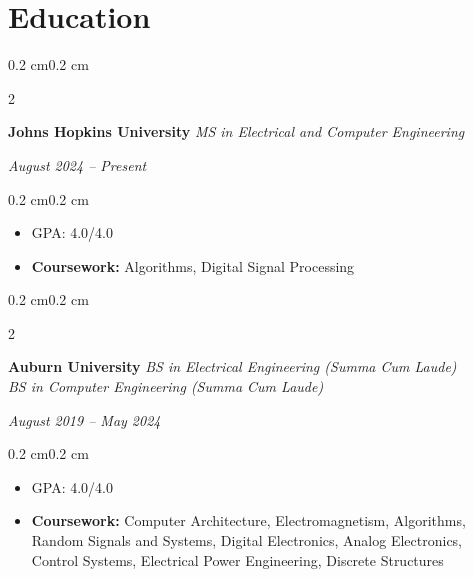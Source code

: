 \documentclass[10pt, letterpaper]{article}
\newenvironment{highlights}{
    \begin{itemize}[topsep=0.10 cm,parsep=0.10 cm,partopsep=0pt,itemsep=0pt,leftmargin=0.4 cm + 10pt]
}{
    \end{itemize}
}
\newenvironment{onecolentry}{
    \begin{adjustwidth}{0.2 cm}{0.2 cm}
}{
    \end{adjustwidth}
}
\newenvironment{twocolentry}[2][]{
    \onecolentry
    \def\secondColumn{#2}
    \setcolumnwidth{\fill, 4.5 cm}
    \begin{paracol}{2}
}{
    \switchcolumn \raggedleft \secondColumn
    \end{paracol}
    \endonecolentry
}
\let\hrefWithoutArrow\href
\renewcommand{\href}[2]{\hrefWithoutArrow{#1}{#2 \raisebox{.15ex}{\footnotesize \faExternalLink*}}}
\begin{document}
    \newpage

    \section{Education}
        \begin{twocolentry}{
        \textit{August 2024 – Present}}
            \textbf{Johns Hopkins University}
            \newline
            \textit{MS in Electrical and Computer Engineering}
        \end{twocolentry}
        \vspace{0.10 cm}
        \begin{onecolentry}
            \begin{highlights}
                \item GPA: 4.0/4.0 %
                \item \textbf{Coursework:} Algorithms, Digital Signal Processing
            \end{highlights}
        \end{onecolentry}
        \vspace{0.2 cm}
        \begin{twocolentry}{
        \textit{August 2019 – May 2024}}
            \textbf{Auburn University}
            \newline
            \textit{BS in Electrical Engineering (Summa Cum Laude)} \\
            \textit{BS in Computer Engineering (Summa Cum Laude)}
        \end{twocolentry}

        \vspace{0.10 cm}
        \begin{onecolentry}
            \begin{highlights}
                \item GPA: 4.0/4.0 %
                \item \textbf{Coursework:} Computer Architecture, Electromagnetism, Algorithms, Random Signals and Systems, Digital Electronics, Analog Electronics, Control Systems, Electrical Power Engineering, Discrete Structures
            \end{highlights}
        \end{onecolentry}
\end{document}
